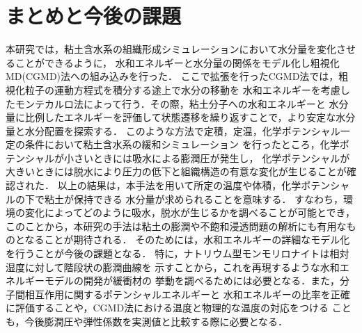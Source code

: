 ﻿\documentclass[11pt,a4j]{jarticle}
\begin{document}
\section{まとめと今後の課題}
本研究では，粘土含水系の組織形成シミュレーションにおいて水分量を変化させることができるように，
水和エネルギーと水分量の関係をモデル化し粗視化MD(CGMD)法への組み込みを行った．
ここで拡張を行ったCGMD法では，粗視化粒子の運動方程式を積分する途上で水分の移動を
水和エネルギーを考慮したモンテカルロ法によって行う．その際，粘土分子への水和エネルギーと
水分量に比例したエネルギーを評価して状態遷移を繰り返すことで，より安定な水分量と水分配置を探索する．
このような方法で定積，定温，化学ポテンシャル一定の条件において粘土含水系の緩和シミュレーション
を行ったところ，化学ポテンシャルが小さいときには吸水による膨潤圧が発生し，
化学ポテンシャルが大きいときには脱水により圧力の低下と組織構造の有意な変化が生じることが確認された．
以上の結果は，本手法を用いて所定の温度や体積，化学ポテンシャルの下で粘土が保持できる
水分量が求められることを意味する．
すなわち，環境の変化によってどのように吸水，脱水が生じるかを調べることが可能とでき，
このことから，本研究の手法は粘土の膨潤や不飽和浸透問題の解析にも有用なものとなることが期待される．
そのためには，水和エネルギーの詳細なモデル化を行うことが今後の課題となる．
特に，ナトリウム型モンモリロナイトは相対湿度に対して階段状の膨潤曲線を
示すことから，これを再現するような水和エネルギーモデルの開発が緩衝材の
挙動を調べるためには必要となる．また，分子間相互作用に関するポテンシャルエネルギーと
水和エネルギーの比率を正確に評価することや，CGMD法における温度と物理的な温度の対応をつける
ことも，今後膨潤圧や弾性係数を実測値と比較する際に必要となる．
%
\end{document}
